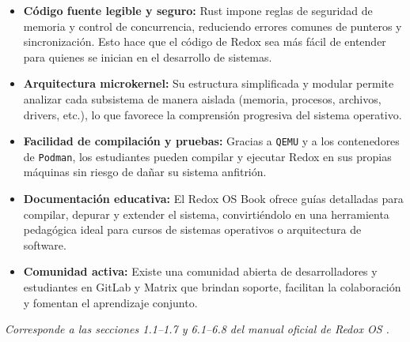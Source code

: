 \begin{itemize}
    \item \textbf{Código fuente legible y seguro:} Rust impone reglas de seguridad de memoria y control de concurrencia, reduciendo errores comunes de punteros y sincronización. Esto hace que el código de Redox sea más fácil de entender para quienes se inician en el desarrollo de sistemas.
    \item \textbf{Arquitectura microkernel:} Su estructura simplificada y modular permite analizar cada subsistema de manera aislada (memoria, procesos, archivos, drivers, etc.), lo que favorece la comprensión progresiva del sistema operativo.
    \item \textbf{Facilidad de compilación y pruebas:} Gracias a \texttt{QEMU} y a los contenedores de \texttt{Podman}, los estudiantes pueden compilar y ejecutar Redox en sus propias máquinas sin riesgo de dañar su sistema anfitrión.
    \item \textbf{Documentación educativa:} El Redox OS Book ofrece guías detalladas para compilar, depurar y extender el sistema, convirtiéndolo en una herramienta pedagógica ideal para cursos de sistemas operativos o arquitectura de software.
    \item \textbf{Comunidad activa:} Existe una comunidad abierta de desarrolladores y estudiantes en GitLab y Matrix que brindan soporte, facilitan la colaboración y fomentan el aprendizaje conjunto.
\end{itemize}

\textit{Corresponde a las secciones 1.1–1.7 y 6.1–6.8 del manual oficial de Redox OS \citep{redox_docs, redox_build_process}.}
